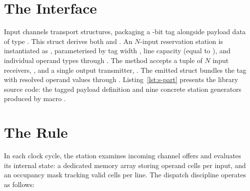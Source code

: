 \documentclass[journal,9pt]{IEEEtran}
\begin{document}
\section{The Interface}
\label{sec:s-interface}

Input channels transport  structures, packaging a
-bit tag alongside payload data of type . This struct derives
both  and . An $N$-input reservation station is
instantiated as , parameterised by tag width
, line capacity  (equal to ), and individual
operand types  through . The  method accepts a tuple
of $N$ input receivers, , and a single output
transmitter, . The emitted  struct
bundles the tag with resolved operand values  through .
Listing~\ref{lst:s-part} presents the library source code: the tagged payload
definition and nine concrete station generators produced by macro
.



\section{The Rule}
\label{sec:s-rule}

In each clock cycle, the station examines incoming channel offers and evaluates
its internal state: a dedicated memory array storing operand cells per input,
and an occupancy mask tracking valid cells per line. The dispatch discipline
operates as follows:
\end{document}
